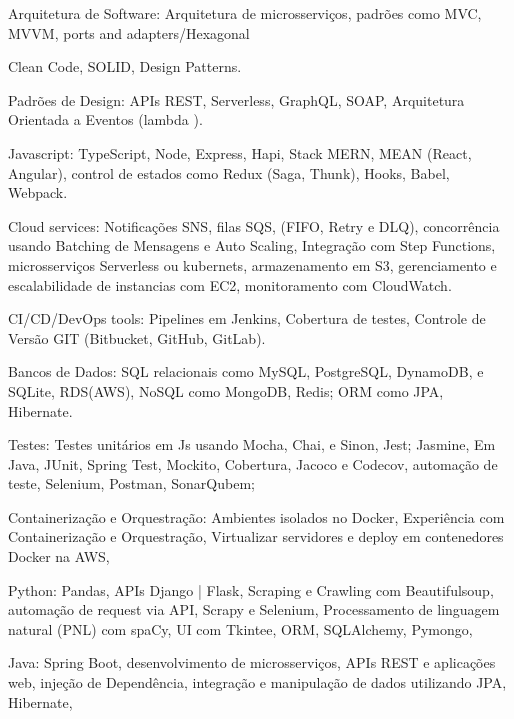 \documentclass[a4paper,10pt]{article}
\begin{document}
\textcolor{corSubSection}{Arquitetura de Software:}
Arquitetura de microsserviços, 
padrões como MVC, MVVM, ports and adapters/Hexagonal

Clean Code, SOLID, Design Patterns.

\textcolor{corSubSection}{Padrões de Design:}
APIs REST, Serverless, GraphQL, SOAP,
Arquitetura Orientada a Eventos (lambda ).

\textcolor{corSubSection}{Javascript:}
TypeScript, Node, Express, Hapi,
Stack MERN, MEAN (React, Angular),
control de estados como Redux (Saga, Thunk), Hooks,
Babel, Webpack.

\textcolor{corSubSection}{Cloud services:}
Notificações SNS,
filas SQS, (FIFO, Retry e DLQ),
concorrência usando Batching de Mensagens e Auto Scaling,
Integração com Step Functions,
microsserviços Serverless ou kubernets,
armazenamento em S3,
gerenciamento e escalabilidade de instancias com EC2,
monitoramento com CloudWatch.

\textcolor{corSubSection}{CI/CD/DevOps tools:}
Pipelines em Jenkins,
Cobertura de testes,
Controle de Versão GIT (Bitbucket, GitHub, GitLab).

\textcolor{corSubSection}{Bancos de Dados:}
SQL relacionais como
MySQL, PostgreSQL, DynamoDB, e SQLite, RDS(AWS),
NoSQL como
MongoDB, Redis;
ORM como JPA, Hibernate.


\textcolor{corSubSection}{Testes:}
Testes unitários em Js usando Mocha, Chai, e Sinon, Jest; Jasmine,
Em Java, JUnit, Spring Test, Mockito,
Cobertura, Jacoco e Codecov,
automação de teste, Selenium, Postman,
SonarQubem;


\textcolor{corSubSection}{Containerização e Orquestração:}
Ambientes isolados no Docker, Experiência com Containerização e Orquestração,
Virtualizar servidores e deploy em contenedores Docker na AWS,

\textcolor{corSubSection}{Python:}
Pandas, APIs Django | Flask, Scraping e Crawling com Beautifulsoup,
automação de request via API, Scrapy e Selenium,
Processamento de linguagem natural (PNL) com spaCy,
UI com Tkintee, ORM, SQLAlchemy, Pymongo,

\textcolor{corSubSection}{Java:}
Spring Boot, desenvolvimento de microsserviços, APIs REST e aplicações web,
injeção de Dependência, integração e manipulação de dados utilizando
JPA, Hibernate,
\end{document}
